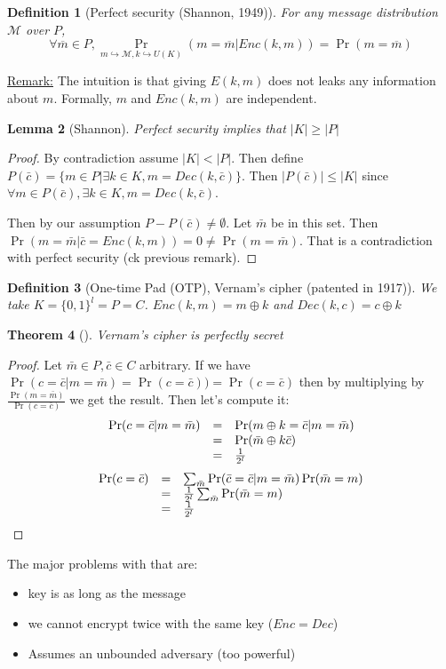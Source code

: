 \documentclass{article}
\newtheorem{thm}{Theorem}[section]
\newtheorem{lem}[thm]{Lemma}
\newtheorem{defi}[thm]{Definition}
\newcommand{\Thm}[3]{\begin{thm}[#1]\label{#2}#3\end{thm}}
\newcommand{\Def}[3]{\begin{defi}[#1]\label{#2}#3\end{defi}}
\newcommand{\Lem}[3]{\begin{lem}[#1]\label{#2}#3\end{lem}}
\begin{document}
\Def{Perfect security (Shannon, 1949)}{def:perfSec}{For any message distribution $\mathcal{M}$ over $P$, \[\forall \overline{m}\in P, \Pr_{m\hookrightarrow\mathcal{M}, k\hookrightarrow U(K)}(m=\overline{m}|Enc(k,m))=\Pr(m=\overline{m})\]}

\underline{Remark:} The intuition is that giving $E(k,m)$ does not leaks any information about $m$. Formally, $m$ and $Enc(k,m)$ are independent.

\Lem{Shannon}{}{Perfect security implies that $|K|\geq|P|$}
\begin{proof}
By contradiction assume $|K|<|P|$. Then define $P(\bar{c})=\{m\in P|\exists k\in K, m=Dec(k,\bar{c})\}$. Then $|P(\bar{c})|\leq|K|$ since $\forall m\in P(\bar{c}),\exists k\in K, m=Dec(k,\bar{c})$.

Then by our assumption $P-P(\bar{c})\neq\emptyset$. Let $\bar{m}$ be in this set. Then $\Pr(m=\bar{m}|\bar{c}=Enc(k,m))=0\neq\Pr(m=\bar{m})$. That is a contradiction with perfect security (ck previous remark).
\end{proof}

\Def{One-time Pad (OTP), Vernam's cipher (patented in 1917)}{def:OTP}{We take $K=\{0,1\}^l=P=C$. $Enc(k,m) = m\oplus k$ and $Dec(k,c)=c\oplus k$}

\Thm{}{thm:OTPPerfect}{Vernam's cipher is perfectly secret}
\begin{proof}
Let $\bar{m}\in P, \bar{c}\in C$ arbitrary. If we have $\Pr(c=\bar{c}|m=\bar{m})=\Pr(c=\bar{c}))=\Pr(c=\bar{c})$ then by multiplying by $\frac{\Pr(m=\bar{m})}{\Pr(c=\bar{c})}$ we get the result. Then let's compute it:
\[\begin{array}{r c l}
\Pr(c=\bar{c}|m=\bar{m}) & = & \Pr(m\oplus k=\bar{c}|m=\bar{m})\\
&=&\Pr(\bar{m}\oplus k \bar{c})\\
&=&\frac{1}{2^l}
\end{array}\]
\[\begin{array}{r c l}
\Pr(c=\bar{c}) & = & \sum_{\bar{m}}\Pr(\bar{c}=\bar{c}|m=\bar{m})\Pr(\bar{m}=m)\\
&=&\frac{1}{2^l}\sum_{\bar{m}}\Pr(\bar{m}=m)\\
&=&\frac{1}{2^l}
\end{array}\]
\end{proof}

The major problems with that are:
\begin{itemize}
\item key is as long as the message
\item we cannot encrypt twice with the same key ($Enc=Dec$)
\item Assumes an unbounded adversary (too powerful)
\end{itemize}
\end{document}
